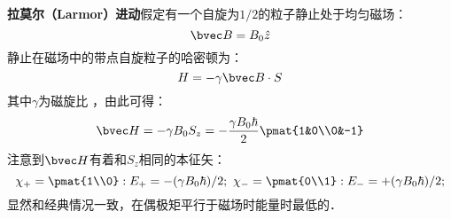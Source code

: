 
\textbf{拉莫尔（Larmor）进动}假定有一个自旋为$1/2$的粒子静止处于均匀磁场：
\begin{equation}
\bvec B =B_0\hat{z}
\end{equation}
静止在磁场中的带点自旋粒子的哈密顿为：
\begin{equation}
H = -\gamma\bvec B\cdot S
\end{equation}
其中$\gamma$为磁旋比 ，由此可得：
\begin{equation}
\bvec H = -\gamma B_0S_z=-\frac{\gamma B_0\hbar}{2}\pmat{1&0\\0&-1}
\end{equation}
注意到$\bvec H$有着和$S_z$相同的本征矢：
\begin{equation}
\chi_+ = \pmat{1\\0}:E_+=-(\gamma B_0\hbar)/2; \ \chi_- = \pmat{0\\1}:E_-=+(\gamma B_0\hbar)/2; 
\end{equation}
显然和经典情况一致，在偶极矩平行于磁场时能量时最低的．

